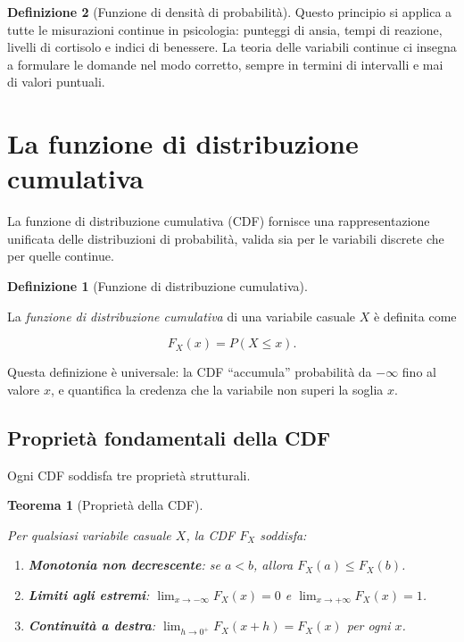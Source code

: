 \documentclass[
  italian,
  letterpaper,
  a4paper,
  11pt,
  open=any]{scrbook}
\providecommand{\tightlist}{%
  \setlength{\itemsep}{0pt}\setlength{\parskip}{0pt}}
\theoremstyle{plain}
\newtheorem{theorem}{Teorema}[chapter]
\theoremstyle{definition}
\theoremstyle{definition}
\newtheorem{definition}{Definizione}[chapter]
\theoremstyle{remark}
\begin{document}
\begin{definition}[Funzione di densità di
probabilità]
Questo principio si applica a tutte le misurazioni continue in
psicologia: punteggi di ansia, tempi di reazione, livelli di cortisolo e
indici di benessere. La teoria delle variabili continue ci insegna a
formulare le domande nel modo corretto, sempre in termini di intervalli
e mai di valori puntuali.

\section{La funzione di distribuzione
cumulativa}\label{la-funzione-di-distribuzione-cumulativa}

La funzione di distribuzione cumulativa (CDF) fornisce una
rappresentazione unificata delle distribuzioni di probabilità, valida
sia per le variabili discrete che per quelle continue.

\begin{definition}[Funzione di distribuzione
cumulativa]\protect\hypertarget{def-cdf-unified}{}\label{def-cdf-unified}

La \emph{funzione di distribuzione cumulativa} di una variabile casuale
\(X\) è definita come

\[
F_X(x) = P(X \leq x).
\]

\end{definition}

Questa definizione è universale: la CDF ``accumula'' probabilità da
\(-\infty\) fino al valore \(x\), e quantifica la credenza che la
variabile non superi la soglia \(x\).

\subsection{Proprietà fondamentali della
CDF}\label{proprietuxe0-fondamentali-della-cdf}

Ogni CDF soddisfa tre proprietà strutturali.

\begin{theorem}[Proprietà della
CDF]\protect\hypertarget{thm-cdf-properties-detail}{}\label{thm-cdf-properties-detail}

Per qualsiasi variabile casuale \(X\), la CDF \(F_X\) soddisfa:

\begin{enumerate}
\def\labelenumi{\arabic{enumi}.}
\tightlist
\item
  \textbf{Monotonia non decrescente}: se \(a < b\), allora
  \(F_X(a) \leq F_X(b)\).
\item
  \textbf{Limiti agli estremi}: \(\lim_{x \to -\infty} F_X(x) = 0\) e
  \(\lim_{x \to +\infty} F_X(x) = 1\).
\item
  \textbf{Continuità a destra}: \(\lim_{h \to 0^+} F_X(x+h) = F_X(x)\)
  per ogni \(x\).
\end{enumerate}


\end{theorem}
\end{definition}
\end{document}
